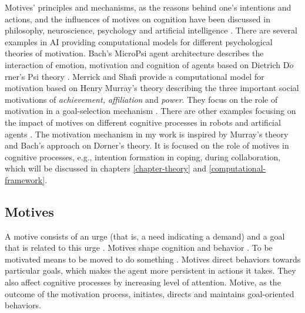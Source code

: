 \documentclass[12pt]{report}
\begin{document}
Motives' principles and mechanisms, as the reasons behind one's intentions and
actions, and the influences of motives on cognition have been discussed in
philosophy, neuroscience, psychology and artificial intelligence
\cite{bach:motivaitional-system-ai, berridge:motivation-concepts-neuroscience,
brody:motivation-goal-action, simon:motivation-emotion-cognition,
sloman:motivation}. There are several examples in AI providing computational
models for different psychological theories of motivation. Bach's MicroPsi agent
architecture describes the interaction of emotion, motivation and cognition of
agents based on Dietrich D$\ddot{o}$rner's Psi theory
\cite{bach:micropsi-agent-architecture, bach:psi, bach:motivaitional-system-ai,
bach:next-generation-micropsi}. Merrick and Shafi provide a computational
model for motivation based on Henry Murray's theory
\cite{murray:personality-exploration} describing the three important social
motivations of \textit{achievement, affiliation} and \textit{power}. They focus
on the role of motivation in a goal-selection mechanism
\cite{merrick:acheievement-affiliation-power}. There are other examples focusing
on the impact of motives on different cognitive processes in robots and
artificial agents \cite{breazeal:motivation-regulating-hri,
dolores:socially-emotional, deSevin:motivational-model-agent,
sellers:comprehensive-emotion-theory, velasquez:emotions-motivations-agents,
wright:implementation-agent-architecture}. The motivation mechanism in my work
is inspired by Murray's theory and Bach's approach on D$\ddot{o}$rner's theory.
It is focused on the role of motives in cognitive processes, e.g.,
intention formation in coping, during collaboration, which will be discussed in
chapters \ref{chapter-theory} and \ref{computational-framework}.

\subsection{Motives}

A motive consists of an urge (that is, a need indicating a demand) and a goal
that is related to this urge \cite{bach:psi}. Motives shape cognition and
behavior \cite{schultheiss:implicit-motive}. To be motivated means to be moved
to do something \cite{ryan:intrinsic-extrinsic-motivations}. Motives direct
behaviors towards particular goals, which makes the agent more persistent in
actions it takes. They also affect cognitive processes by increasing level of
attention. Motive, as the outcome of the motivation process, initiates, directs
and maintains goal-oriented behaviors.
\end{document}
